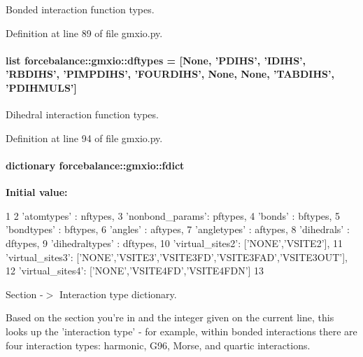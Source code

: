 \-Bonded interaction function types. 



\-Definition at line 89 of file gmxio.\-py.

\hypertarget{namespaceforcebalance_1_1gmxio_a5520b315e210120bb3e14af3665d568c}{
\paragraph[{dftypes}]{\setlength{\rightskip}{0pt plus 5cm}list {\bf forcebalance\-::gmxio\-::dftypes} = \mbox{[}\-None, '\-P\-D\-I\-H\-S', '\-I\-D\-I\-H\-S', '\-R\-B\-D\-I\-H\-S', '\-P\-I\-M\-P\-D\-I\-H\-S', '\-F\-O\-U\-R\-D\-I\-H\-S', \-None, \-None, '\-T\-A\-B\-D\-I\-H\-S', '\-P\-D\-I\-H\-M\-U\-L\-S'\mbox{]}}}\label{namespaceforcebalance_1_1gmxio_a5520b315e210120bb3e14af3665d568c}


\-Dihedral interaction function types. 



\-Definition at line 94 of file gmxio.\-py.

\hypertarget{namespaceforcebalance_1_1gmxio_ac4e46dd6adabe0dfdeddcd86e772ad33}{
\paragraph[{fdict}]{\setlength{\rightskip}{0pt plus 5cm}dictionary {\bf forcebalance\-::gmxio\-::fdict}}}\label{namespaceforcebalance_1_1gmxio_ac4e46dd6adabe0dfdeddcd86e772ad33}
{\bfseries \-Initial value\-:}
\begin{DoxyCode}
1 {
2     'atomtypes'     : nftypes,
3     'nonbond_params': pftypes,
4     'bonds'         : bftypes,
5     'bondtypes'     : bftypes,
6     'angles'        : aftypes,
7     'angletypes'    : aftypes,
8     'dihedrals'     : dftypes,
9     'dihedraltypes' : dftypes,
10     'virtual_sites2': ['NONE','VSITE2'],
11     'virtual_sites3': ['NONE','VSITE3','VSITE3FD','VSITE3FAD','VSITE3OUT'],
12     'virtual_sites4': ['NONE','VSITE4FD','VSITE4FDN']
13     }
\end{DoxyCode}


\-Section -\/$>$ \-Interaction type dictionary. 

\-Based on the section you're in and the integer given on the current line, this looks up the 'interaction type' -\/ for example, within bonded interactions there are four interaction types\-: harmonic, \-G96, \-Morse, and quartic interactions. 

